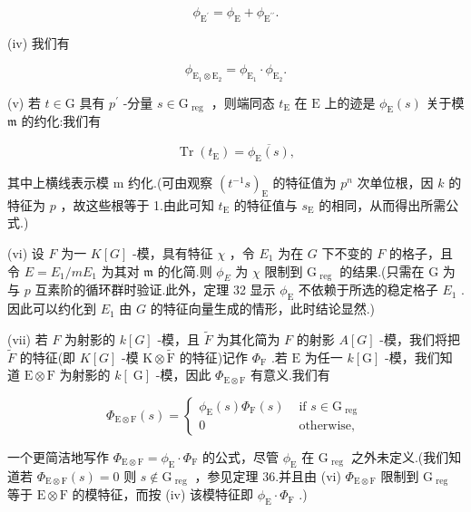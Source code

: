 \documentclass[10pt]{article}
\begin{document}
\[
{\phi }_{{\mathrm{E}}^{\prime }} = {\phi }_{\mathrm{E}} + {\phi }_{{\mathrm{E}}^{\prime \prime }}.
\]

(iv) 我们有

\[
{\phi }_{{\mathrm{E}}_{1} \otimes  {\mathrm{E}}_{2}} = {\phi }_{{\mathrm{E}}_{1}} \cdot  {\phi }_{{\mathrm{E}}_{2}}.
\]

(v) 若 \(t \in  \mathrm{G}\) 具有 \({p}^{\prime }\) -分量 \(s \in  {\mathrm{G}}_{\text{ reg }}\) ，则端同态 \({t}_{\mathrm{E}}\) 在 \(\mathrm{E}\) 上的迹是 \({\phi }_{\mathrm{E}}\left( s\right)\) 关于模 \(\mathfrak{m}\) 的约化:我们有

\[
\operatorname{Tr}\left( {t}_{\mathrm{E}}\right)  = \overline{{\phi }_{\mathrm{E}}\left( s\right) },
\]

其中上横线表示模 m 约化.(可由观察 \({\left( {t}^{-1}s\right) }_{\mathrm{E}}\) 的特征值为 \({p}^{n}\) 次单位根，因 \(k\) 的特征为 \(p\) ，故这些根等于 1.由此可知 \({t}_{\mathrm{E}}\) 的特征值与 \({s}_{\mathrm{E}}\) 的相同，从而得出所需公式.)

(vi) 设 \(F\) 为一 \(K\left\lbrack  G\right\rbrack\) -模，具有特征 \(\chi\) ，令 \({E}_{1}\) 为在 \(G\) 下不变的 \(F\) 的格子，且令 \(E = {E}_{1}/m{E}_{1}\) 为其对 \(\mathfrak{m}\) 的化简.则 \({\phi }_{E}\) 为 \(\chi\) 限制到 \({\mathrm{G}}_{\text{ reg }}\) 的结果.(只需在 \(\mathrm{G}\) 为与 \(p\) 互素阶的循环群时验证.此外，定理 32 显示 \({\phi }_{\mathrm{E}}\) 不依赖于所选的稳定格子 \({E}_{1}\) .因此可以约化到 \({E}_{1}\) 由 \(G\) 的特征向量生成的情形，此时结论显然.)

(vii) 若 \(F\) 为射影的 \(k\left\lbrack  G\right\rbrack\) -模，且 \(\widetilde{F}\) 为其化简为 \(F\) 的射影 \(A\left\lbrack  G\right\rbrack\) -模，我们将把 \(\widetilde{F}\) 的特征(即 \(K\left\lbrack  G\right\rbrack\) -模 \(\mathrm{K} \otimes  \widetilde{\mathrm{F}}\) 的特征)记作 \({\Phi }_{\mathrm{F}}\) .若 \(\mathrm{E}\) 为任一 \(k\left\lbrack  \mathrm{G}\right\rbrack\) -模，我们知道 \(\mathrm{E} \otimes  \mathrm{F}\) 为射影的 \(k\left\lbrack  \mathrm{\;G}\right\rbrack\) -模，因此 \({\Phi }_{\mathrm{E} \otimes  \mathrm{F}}\) 有意义.我们有

\[
{\Phi }_{\mathrm{E} \otimes  \mathrm{F}}\left( s\right)  = \left\{  \begin{array}{ll} {\phi }_{\mathrm{E}}\left( s\right) {\Phi }_{\mathrm{F}}\left( s\right) & \text{ if }s \in  {\mathrm{G}}_{\text{ reg }} \\  0 & \text{ otherwise, } \end{array}\right.
\]

一个更简洁地写作 \({\Phi }_{\mathrm{E} \otimes  \mathrm{F}} = {\phi }_{\mathrm{E}} \cdot  {\Phi }_{\mathrm{F}}\) 的公式，尽管 \({\phi }_{\mathrm{E}}\) 在 \({\mathrm{G}}_{\text{ reg }}\) 之外未定义.(我们知道若 \({\Phi }_{\mathrm{E} \otimes  \mathrm{F}}\left( s\right)  = 0\) 则 \(s \notin  {\mathrm{G}}_{\text{ reg }}\) ，参见定理 36.并且由 (vi) \({\Phi }_{\mathrm{E} \otimes  \mathrm{F}}\) 限制到 \({\mathrm{G}}_{\text{ reg }}\) 等于 \(\mathrm{E} \otimes  \mathrm{F}\) 的模特征，而按 (iv) 该模特征即 \({\phi }_{\mathrm{E}} \cdot  {\Phi }_{\mathrm{F}}\) .)
\end{document}
